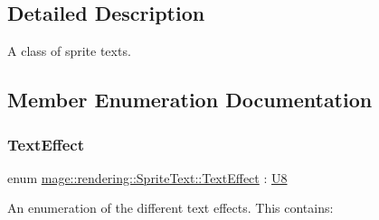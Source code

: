 \subsection{Detailed Description}
A class of sprite texts. 

\subsection{Member Enumeration Documentation}
\hypertarget{classmage_1_1rendering_1_1_sprite_text_af07ecf28d2ab8997c011cab74e799ef7}{}\label{classmage_1_1rendering_1_1_sprite_text_af07ecf28d2ab8997c011cab74e799ef7} 
\subsubsection{\texorpdfstring{Text\+Effect}{TextEffect}}
{\footnotesize\ttfamily enum \hyperlink{classmage_1_1rendering_1_1_sprite_text_af07ecf28d2ab8997c011cab74e799ef7}{mage\+::rendering\+::\+Sprite\+Text\+::\+Text\+Effect} \+: \hyperlink{namespacemage_afc638980bc6154f15af5e2d93a0e0ea9}{U8}\hspace{0.3cm}{\ttfamily [strong]}}

An enumeration of the different text effects. This contains\+:

